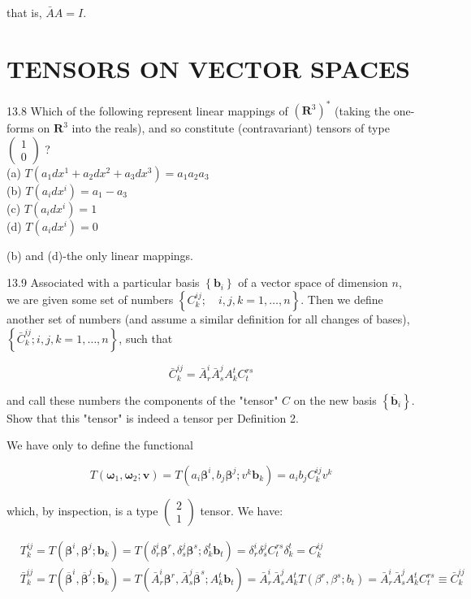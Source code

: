 \documentclass[10pt]{article}
\begin{document}
that is, $\bar{A} A=I$.

\section*{TENSORS ON VECTOR SPACES}
13.8 Which of the following represent linear mappings of $\left(\mathbf{R}^{3}\right)^{*}$ (taking the one-forms on $\mathbf{R}^{3}$ into the reals), and so constitute (contravariant) tensors of type $\left(\begin{array}{l}1 \\ 0\end{array}\right)$ ?\\
(a) $T\left(a_{1} d x^{1}+a_{2} d x^{2}+a_{3} d x^{3}\right)=a_{1} a_{2} a_{3}$\\
(b) $T\left(a_{i} d x^{i}\right)=a_{1}-a_{3}$\\
(c) $T\left(a_{i} d x^{i}\right)=1$\\
(d) $T\left(a_{i} d x^{i}\right)=0$

(b) and (d)-the only linear mappings.

13.9 Associated with a particular basis $\left\{\mathbf{b}_{i}\right\}$ of a vector space of dimension $n$, we are given some set of numbers $\left\{C_{k}^{i j} ; \quad i, j, k=1, \ldots, n\right\}$. Then we define another set of numbers (and assume a similar definition for all changes of bases), $\left\{\bar{C}_{k}^{i j} ; i, j, k=1, \ldots, n\right\}$, such that

$$
\bar{C}_{k}^{i j}=\bar{A}_{r}^{i} \bar{A}_{s}^{j} A_{k}^{t} C_{t}^{r s}
$$

and call these numbers the components of the "tensor" $C$ on the new basis $\left\{\overline{\mathbf{b}}_{i}\right\}$. Show that this "tensor" is indeed a tensor per Definition 2.

We have only to define the functional

$$
T\left(\boldsymbol{\omega}_{1}, \boldsymbol{\omega}_{2} ; \mathbf{v}\right)=T\left(a_{i} \boldsymbol{\beta}^{i}, b_{j} \boldsymbol{\beta}^{j} ; v^{k} \mathbf{b}_{k}\right)=a_{i} b_{j} C_{k}^{i j} v^{k}
$$

which, by inspection, is a type $\left(\begin{array}{l}2 \\ 1\end{array}\right)$ tensor. We have:

$$
\begin{aligned}
& T_{k}^{i j}=T\left(\boldsymbol{\beta}^{i}, \boldsymbol{\beta}^{j} ; \mathbf{b}_{k}\right)=T\left(\delta_{r}^{i} \boldsymbol{\beta}^{r}, \delta_{s}^{j} \boldsymbol{\beta}^{s} ; \delta_{k}^{t} \mathbf{b}_{t}\right)=\delta_{r}^{i} \delta_{s}^{j} C_{t}^{r s} \delta_{k}^{t}=C_{k}^{i j} \\
& \bar{T}_{k}^{i j}=T\left(\overline{\boldsymbol{\beta}}^{i}, \overline{\boldsymbol{\beta}}^{j} ; \overline{\mathbf{b}}_{k}\right)=T\left(\bar{A}_{r}^{i} \boldsymbol{\beta}^{r}, \bar{A}_{s}^{j} \overline{\boldsymbol{\beta}}^{s} ; A_{k}^{t} \mathbf{b}_{t}\right)=\bar{A}_{r}^{i} \bar{A}_{s}^{j} A_{k}^{t} T\left(\beta^{r}, \beta^{s} ; b_{t}\right)=\bar{A}_{r}^{i} \bar{A}_{s}^{j} A_{k}^{t} C_{t}^{r s} \equiv \bar{C}_{k}^{i j}
\end{aligned}
$$
\end{document}
